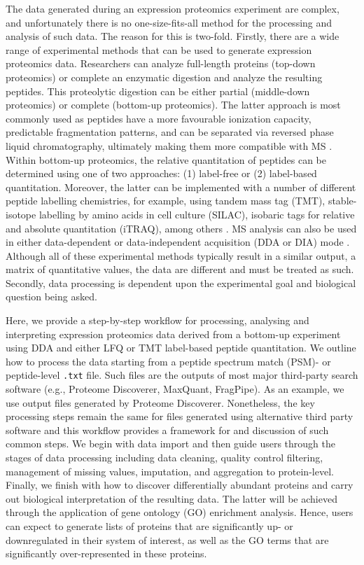 \documentclass[9pt,a4paper,]{extarticle}
\begin{document}
The data generated during an expression proteomics experiment are complex, and
unfortunately there is no one-size-fits-all method for the processing and analysis
of such data. The reason for this is two-fold. Firstly, there are a wide range
of experimental methods that can be used to generate expression proteomics data.
Researchers can analyze full-length proteins (top-down proteomics) or complete
an enzymatic digestion and analyze the resulting peptides. This proteolytic
digestion can be either partial (middle-down proteomics) or complete (bottom-up
proteomics). The latter approach is most commonly used as peptides have a more
favourable ionization capacity, predictable fragmentation patterns, and can be
separated via reversed phase liquid chromatography, ultimately making them more
compatible with MS \citep{Dupree2020}. Within bottom-up proteomics, the relative
quantitation of peptides can be determined using one of two approaches: (1)
label-free or (2) label-based quantitation. Moreover, the latter can be
implemented with a number of different peptide labelling chemistries, for example,
using tandem mass tag (TMT), stable-isotope labelling by amino acids in cell
culture (SILAC), isobaric tags for relative and absolute quantitation (iTRAQ),
among others \citep{Obermaier2015}. MS analysis can also be used in either data-dependent
or data-independent acquisition (DDA or DIA) mode \citep{FernndezCosta2020, Hu2016}.
Although all of these experimental methods typically result in a similar output,
a matrix of quantitative values, the data are different and must be treated as such.
Secondly, data processing is dependent upon the experimental goal and biological
question being asked.

Here, we provide a step-by-step workflow for processing, analysing and
interpreting expression proteomics data derived from a bottom-up experiment
using DDA and either LFQ or TMT label-based peptide quantitation. We outline how
to process the data starting from a peptide spectrum match (PSM)- or peptide-level
\texttt{.txt} file. Such files are the outputs of most major third-party search
software (e.g., Proteome Discoverer, MaxQuant, FragPipe). As an example, we use
output files generated by Proteome Discoverer. Nonetheless, the key processing
steps remain the same for files generated using alternative third party software
and this workflow provides a framework for and discussion of such common steps.
We begin with data import and then guide users through the stages of data processing
including data cleaning, quality control filtering, management of missing values,
imputation, and aggregation to protein-level. Finally, we finish with how to discover
differentially abundant proteins and carry out biological interpretation of the
resulting data. The latter will be achieved through the application of gene
ontology (GO) enrichment analysis. Hence, users can expect to generate lists of
proteins that are significantly up- or downregulated in their system of interest,
as well as the GO terms that are significantly over-represented in these proteins.
\end{document}
